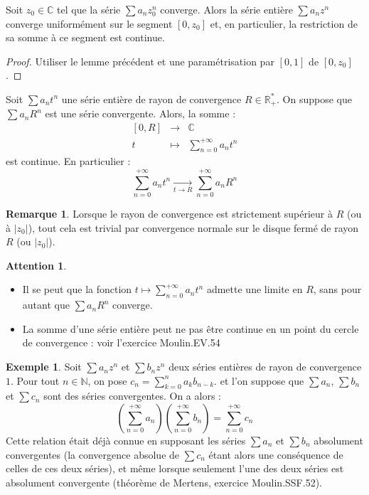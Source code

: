 \documentclass[french]{article}
\newcommand{\N}{\mathbb{N}}
\newcommand{\R}{\mathbb{R}}
\newcommand{\C}{\mathbb{C}}
\newcommand{\st}{^*}
\theoremstyle{plain}
\theoremstyle{definition}
\newtheorem*{ex}{Exemple}
\newtheorem*{rmq}{Remarque}
\newtheorem*{attention}{Attention}
\theoremstyle{remark}
\begin{document}
\begin{thm}%
	Soit $z_0\in\C$ tel que la série $\displaystyle\sum a_nz_0^n$ converge. Alors la série entière $\displaystyle\sum a_nz^n$ converge uniformément sur le segment $[0,z_0]$ et, en particulier, la restriction de sa somme à ce segment est continue. 
\end{thm}
\begin{proof}
	Utiliser le lemme précédent et une paramétrisation par $[0,1]$ de $[0,z_0]$.
\end{proof}

\begin{thm}%
	Soit $\displaystyle\sum a_nt^n$ une série entière de rayon de convergence $R\in\R_+\st$. On suppose que $\displaystyle\sum a_nR^n$ est une série convergente. Alors, la somme : $$\begin{array}{rcl}
		[0,R]&\longrightarrow&\C\\
		t&\longmapsto&\displaystyle\sum_{n=0}^{+\infty} a_nt^n
	\end{array}$$ est continue. En particulier : $$\sum_{n=0}^{+\infty}a_nt^n\xrightarrow[t\to R]{}\sum_{n=0}^{+\infty}a_nR^n$$
\end{thm}

\begin{rmq}
	Lorsque le rayon de convergence est strictement supérieur à $R$ (ou à $\lvert z_0\rvert$), tout cela est trivial par convergence normale sur le disque fermé de rayon $R$ (ou $\lvert z_0\rvert$).
\end{rmq}

\begin{attention}
	\begin{itemize}
	\item Il se peut que la fonction $t\mapsto\displaystyle\sum_{n=0}^{+\infty}a_nt^n$ admette une limite en $R$, sans pour autant que $\displaystyle\sum a_nR^n$ converge.
	\item La somme d'une série entière peut ne pas être continue en un point du cercle de convergence : voir l'exercice Moulin.EV.54
\end{itemize}
\end{attention}

\begin{ex}
	Soit $\displaystyle\sum a_nz^n$ et $\displaystyle\sum b_nz^n$ deux séries entières de rayon de convergence $1$. Pour tout $n\in\N$, on pose $c_n=\displaystyle\sum_{k=0}^{n}a_kb_{n-k}$. et l'on suppose que $\displaystyle\sum a_n$, $\displaystyle\sum b_n$ et $\displaystyle \sum c_n$ sont des séries convergentes. On a alors : $$\left(\sum_{n=0}^{+\infty}a_n\right)\left(\sum_{n=0}^{+\infty}b_n\right)=\sum_{n=0}^{+\infty}c_n$$
	Cette relation était déjà connue en supposant les séries $\displaystyle\sum a_n$ et $\displaystyle\sum b_n$ absolument convergentes (la convergence absolue de $\displaystyle\sum c_n$ étant alors une conséquence de celles de ces deux séries), et même lorsque seulement l'une des deux séries est absolument convergente (théorème de Mertens, exercice Moulin.SSF.52).
\end{ex}
\end{document}
